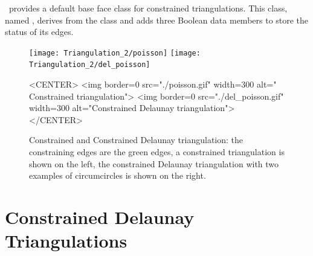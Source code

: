 \cgal\ provides a default base face class
for constrained triangulations. This class, named
,
derives from the class
and adds three Boolean data members to store the status of its edges. 


\begin{figure}
\begin{ccTexOnly}
\begin{center}
\texttt{[image: Triangulation\_2/poisson]}
\texttt{[image: Triangulation\_2/del\_poisson]}
\end{center}
\end{ccTexOnly}

\begin{ccHtmlOnly}
<CENTER>
<img border=0 src="./poisson.gif" width=300 alt=" Constrained triangulation">
<img border=0 src="./del_poisson.gif" width=300 alt="Constrained Delaunay triangulation">
</CENTER>
\end{ccHtmlOnly}

\caption{Constrained and Constrained Delaunay triangulation: 
 the constraining edges are the green edges,  a constrained
triangulation is shown on the left, the constrained Delaunay
triangulation with two examples of circumcircles is shown on the right.}
\label{2D_Triangulation_Fig_constrained}
\end{figure}


\section{Constrained Delaunay Triangulations\label{Section_2D_Triangulations_Constrained_Delaunay}}

